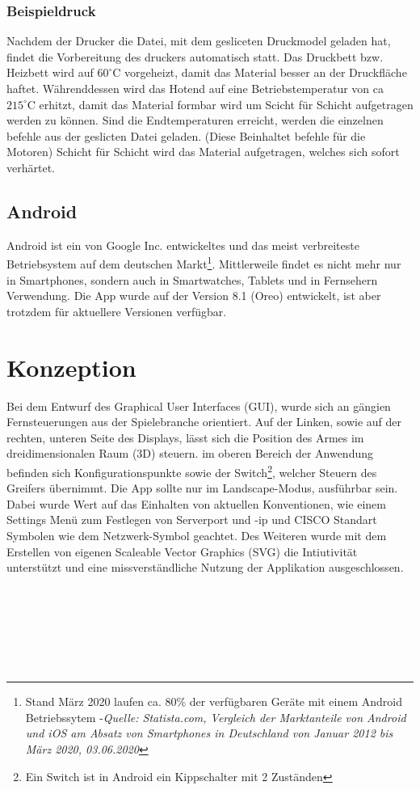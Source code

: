 \documentclass[12pt,					%
							 oneside,			%
							 a4paper,			%
							 halfparskip,		%
							 liststotoc,			%
							 bibtotoc,			%
							 fleqn,				%
							 pointlessnumbers]	%
							 {scrreprt}
\begin{document}
\subsection{Beispieldruck}
Nachdem der Drucker die Datei, mit dem gesliceten Druckmodel geladen hat, findet die Vorbereitung des druckers automatisch statt.
Das Druckbett bzw. Heizbett wird auf $60^\circ\text{C}$ vorgeheizt, damit das Material besser an der Druckfläche haftet.
Währenddessen wird das Hotend auf eine Betriebstemperatur von ca  $215^\circ\text{C}$ erhitzt, damit das Material formbar wird um Scicht für Schicht aufgetragen werden zu können.
Sind die Endtemperaturen erreicht, werden die einzelnen befehle aus der geslicten Datei geladen. (Diese Beinhaltet befehle für die Motoren)
Schicht für Schicht wird das Material aufgetragen, welches sich sofort verhärtet.
\section{Android}
Android ist ein von Google Inc. entwickeltes und das meist verbreiteste Betriebsystem auf dem deutschen Markt\footnote{Stand März 2020 laufen ca. 80\% der verfügbaren Geräte mit einem Android Betriebssytem -\textit{Quelle: Statista.com, \glqq{}Vergleich der Marktanteile von Android und iOS am Absatz von Smartphones in Deutschland von Januar 2012 bis März 2020\grqq{}, 03.06.2020}\cite{Tenzer2020}}. Mittlerweile findet es nicht mehr nur in Smartphones, sondern auch in Smartwatches, Tablets und in Fernsehern Verwendung. Die App wurde auf der Version 8.1 (Oreo) entwickelt, ist aber trotzdem für aktuellere Versionen verfügbar.
\chapter{Konzeption}
Bei dem Entwurf des Graphical User Interfaces (GUI), wurde sich an gängien Fernsteuerungen aus der Spielebranche orientiert. Auf der Linken, sowie auf der rechten, unteren Seite des Displays, lässt sich die Position des Armes im dreidimensionalen Raum (3D) steuern. im oberen Bereich der Anwendung befinden sich Konfigurationspunkte sowie der \glqq{}Switch\grqq{}\footnote{Ein Switch ist in Android ein Kippschalter mit 2 Zuständen}, welcher Steuern des Greifers übernimmt. Die App sollte nur im \glqq{}Landscape\grqq{}-Modus, ausführbar sein. Dabei wurde Wert auf das Einhalten von aktuellen Konventionen, wie einem Settings Menü zum Festlegen von Serverport und -ip und CISCO Standart Symbolen wie dem Netzwerk-Symbol geachtet. Des Weiteren wurde mit dem Erstellen von eigenen Scaleable Vector Graphics (SVG) die Intiutivität unterstützt und eine missverständliche Nutzung der Applikation ausgeschlossen.\\ \\ \\ \\ \\ \\ \\
\end{document}
